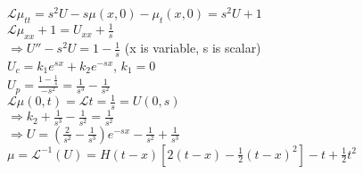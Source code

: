 \documentclass[10pt]{article}
\newcommand{\Lap}{\mathcal{L}}
\begin{document}
\begin{multicols}{2}
\begin{enumerate}
	$\Lap{\mu_{tt}} = s^2U-s\mu(x,0) - \mu_t(x,0) = s^2U + 1$\\
	$\Lap{\mu_{xx} + 1} = U_{xx} + \frac{1}{s}$\\
	$\Rightarrow U'' - s^2U = 1 - \frac{1}{s}$ (x is variable, s is scalar)\\
	$U_c = k_1e^{sx} + k_2e^{-sx}$, $k_1 = 0$\\
	$U_p = \frac{1 - \frac{1}{s}}{-s^2} = \frac{1}{s^3} - \frac{1}{s^2}$\\
	$\Lap{\mu(0,t)} = \Lap{t} = \frac{1}{s} = U(0,s)$\\
	$\Rightarrow k_2 + \frac{1}{s^3} - \frac{1}{s^2} = \frac{1}{s^2}$\\
	$\Rightarrow U = (\frac{2}{s^2} - \frac{1}{s^3})e^{-sx} - \frac{1}{s^2} + \frac{1}{s^3}$\\
	$\mu = \Lap^{-1}(U) = H(t-x)[2(t-x)-\frac{1}{2}(t-x)^2] - t + \frac{1}{2}t^2$ 
		
		
\end{enumerate}
\newpage
\end{multicols}
\end{document}
